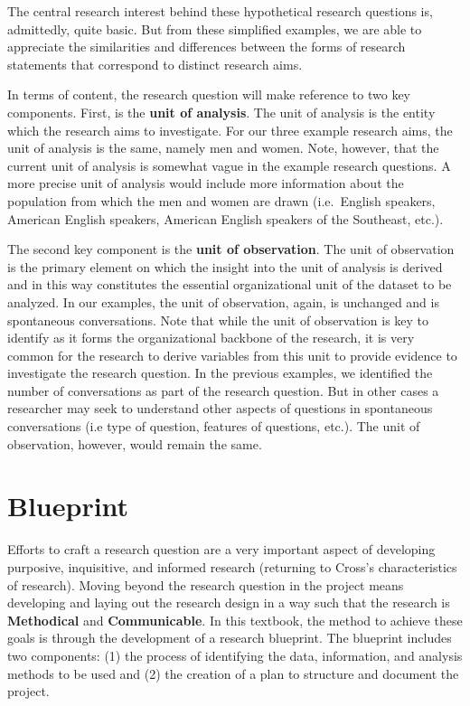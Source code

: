 \documentclass[
  letterpaper,
]{latex/krantz}
\begin{document}
The central research interest behind these hypothetical research
questions is, admittedly, quite basic. But from these simplified
examples, we are able to appreciate the similarities and differences
between the forms of research statements that correspond to distinct
research aims.

In terms of content, the research question will make reference to two
key components. First, is the \textbf{unit of analysis}. The unit of
analysis is the entity which the research aims to investigate. For our
three example research aims, the unit of analysis is the same, namely
men and women. Note, however, that the current unit of analysis is
somewhat vague in the example research questions. A more precise unit of
analysis would include more information about the population from which
the men and women are drawn (i.e.~English speakers, American English
speakers, American English speakers of the Southeast, etc.).

The second key component is the \textbf{unit of observation}. The unit
of observation is the primary element on which the insight into the unit
of analysis is derived and in this way constitutes the essential
organizational unit of the dataset to be analyzed. In our examples, the
unit of observation, again, is unchanged and is spontaneous
conversations. Note that while the unit of observation is key to
identify as it forms the organizational backbone of the research, it is
very common for the research to derive variables from this unit to
provide evidence to investigate the research question. In the previous
examples, we identified the number of conversations as part of the
research question. But in other cases a researcher may seek to
understand other aspects of questions in spontaneous conversations (i.e
type of question, features of questions, etc.). The unit of observation,
however, would remain the same.

\hypertarget{blueprint}{%
\section{Blueprint}\label{blueprint}}

Efforts to craft a research question are a very important aspect of
developing purposive, inquisitive, and informed research (returning to
Cross's characteristics of research). Moving beyond the research
question in the project means developing and laying out the research
design in a way such that the research is \textbf{Methodical} and
\textbf{Communicable}. In this textbook, the method to achieve these
goals is through the development of a research blueprint. The blueprint
includes two components: (1) the process of identifying the data,
information, and analysis methods to be used and (2) the creation of a
plan to structure and document the project.
\end{document}
